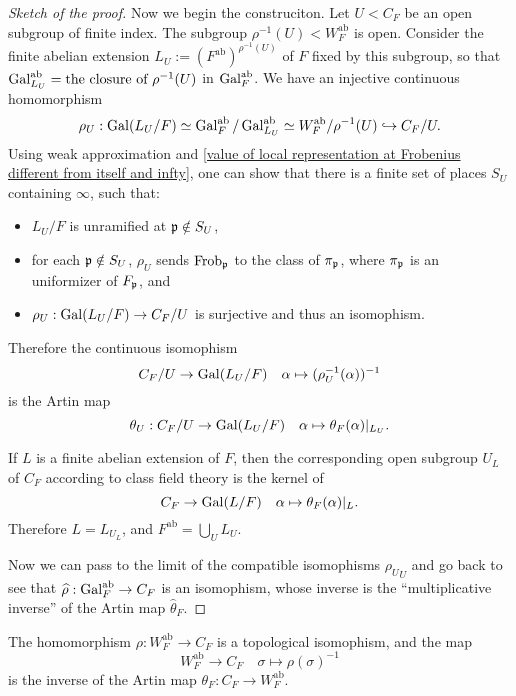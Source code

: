 \documentclass{article}
\renewcommand{\O}{\mathcal{O}}
\DeclareMathOperator{\frob}{Frob}
\newcommand{\ab}{\mathrm{ab}}
\begin{document}
\begin{proof}[Sketch of the proof]
Now we begin the construciton.
Let $U < C_F$ be an open subgroup of finite index.
The subgroup $\rho^{-1}(U) < W_F^\ab$ is open.
Consider the finite abelian extension $L_U := (F^\ab)^{\rho^{-1}(U)}$ of $F$ fixed by this subgroup,
so that $\gal_{L_U}^\ab = \text{the closure of }\rho^{-1}(U)$ in $\gal_F^\ab$.
We have an injective continuous homomorphism
\[\rho_U : \gal(L_U/F) \simeq\gal_F^\ab/\gal_{L_U}^\ab \simeq W_F^\ab/\rho^{-1}(U)\hookrightarrow C_F/U.\]
Using weak approximation and \cref{value of local representation at Frobenius different from itself and infty}, one can show that there is a finite set of places $S_U$ containing $\infty$, such that:
\begin{itemize}
    \item $L_U/F$ is unramified at $\mathfrak{p}\notin S_U$,
    \item for each $\mathfrak{p}\notin S_U$, $\rho_U$ sends $\frob_\p$ to the class of $\pi_{\mathfrak{p}}$, where $\pi_{\mathfrak{p}}$ is an uniformizer of $F_{\mathfrak{p}}$, and
    \item $\rho_U : \operatorname{Gal}(L_U/F)\to C_F/U$ is surjective and thus an isomophism.
\end{itemize}
Therefore the continuous isomophism\[C_F/U\to \operatorname{Gal}(L_U/F)\quad \alpha\mapsto (\rho_U^{-1}(\alpha))^{-1}\] is the Artin map \[\theta_U : C_F/U\to \operatorname{Gal}(L_U/F)\quad \alpha\mapsto\theta_F(\alpha)|_{L_U}.\]

If $L$ is a finite abelian extension of $F$,
then the corresponding open subgroup $U_L$ of $C_F$
according to class field theory is the kernel of
\[C_F\to \operatorname{Gal}(L/F)\quad \alpha\mapsto\theta_F(\alpha)|_{L}.\]
Therefore $L = L_{U_L}$,
and $F^\ab = \bigcup_{U}L_U$.

Now we can pass to the limit of the compatible isomophisms ${\rho_U}_U$ and go back to see that $\hat\rho : \gal_F^\ab\to C_F$ is an isomophism,
whose inverse is the ``multiplicative inverse'' of the Artin map $\hat\theta_F$.
\end{proof}

\begin{corollary}
    The homomorphism $\rho : W_F^\ab\to C_F$ is a topological isomophism, and the map \[W_F^\ab\to C_F\quad \sigma\mapsto \rho(\sigma)^{-1}\]
    is the inverse of the Artin map $\theta_F : C_F\to W_F^\ab$.
\end{corollary}
\end{document}
